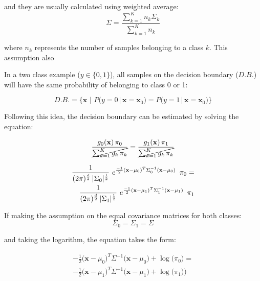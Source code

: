 \documentclass{article}
\begin{document}
and they are usually calculated using weighted average:
\begin{equation} 
\Sigma = \frac{\sum_{k=1}^K {n_k\Sigma_k}}{\sum_{k=1}^K{n_k}}
\end{equation}

where $n_k$ represents the number of samples belonging to a class $k$. This assumption also 

In a two class example ($y \in \{0,1\}$), all samples on the decision boundary ($D.B.$) will have the same probability of belonging to class 0 or 1:

\begin{equation} 
D.B. = \Big\{\mathbf{x}\,\, \Big| \,\,P\big(y=0 \, \big| \, \mathbf{x}=\mathbf{x}_0\big) = P\big(y=1 \, \big| \, \mathbf{x}=\mathbf{x}_0\big) \Big\}
\end{equation}

Following this idea, the decision boundary can be estimated by solving the equation:

\begin{equation} 
\frac{g_0(\mathbf{x}) \, \pi_0} {\cancel{\sum_{k=1}^K{g_k \, \pi_k}}} = \frac{g_1(\mathbf{x}) \, \pi_1} {\cancel{\sum_{k=1}^K{g_k \, \pi_k}}}
\end{equation}


\begin{equation} 
\begin{split}
\frac{1}{(2 \pi)^{\nicefrac{d}{2}}\, |\Sigma_0|^{\nicefrac{1}{2}}}\,\, e^{\nicefrac{-1}{2}  (\mathbf{x}-\mu_0)^T  \Sigma_0^{-1} (\mathbf{x}-\mu_0)}  \,\,\,\pi_0 = \\
\frac{1}{(2 \pi)^{\nicefrac{d}{2}}\, |\Sigma_1|^{\nicefrac{1}{2}}}\,\, e^{\nicefrac{-1}{2}  (\mathbf{x}-\mu_1)^T  \Sigma_1^{-1} (\mathbf{x}-\mu_1)}  \,\,\,\pi_1
\end{split}
\end{equation}

If making the assumption on the equal covariance matrices for both classes:
\begin{equation} 
\Sigma_0 = \Sigma_1  = \Sigma
\end{equation}

and taking the logarithm, the equation takes the form: 

\begin{equation} 
\begin{split}
-\frac{1}{2}  \Big(\mathbf{x}-\mu_0\Big)^T  \Sigma^{-1} \Big(\mathbf{x}-\mu_0\Big) +  \log{\Big(\pi_0\Big)}= \\
-\frac{1}{2}  \Big(\mathbf{x}-\mu_1\Big)^T  \Sigma^{-1} \Big(\mathbf{x}-\mu_1\Big) +  \log{\Big(\pi_1)\Big)}
\end{split}
\end{equation}
\end{document}
